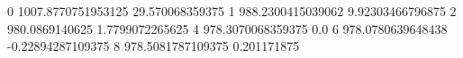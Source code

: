0 1007.8770751953125 29.570068359375
1 988.2300415039062 9.92303466796875
2 980.0869140625 1.7799072265625
4 978.3070068359375 0.0
6 978.0780639648438 -0.22894287109375
8 978.5081787109375 0.201171875
